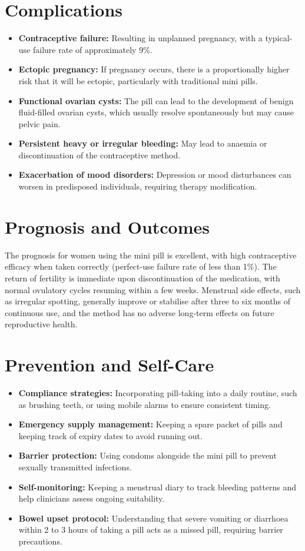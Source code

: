 \section*{Complications}
\begin{itemize}
    \item \textbf{Contraceptive failure:} Resulting in unplanned pregnancy, with a typical-use failure rate of approximately 9\%.
    \item \textbf{Ectopic pregnancy:} If pregnancy occurs, there is a proportionally higher risk that it will be ectopic, particularly with traditional mini pills.
    \item \textbf{Functional ovarian cysts:} The pill can lead to the development of benign fluid-filled ovarian cysts, which usually resolve spontaneously but may cause pelvic pain.
    \item \textbf{Persistent heavy or irregular bleeding:} May lead to anaemia or discontinuation of the contraceptive method.
    \item \textbf{Exacerbation of mood disorders:} Depression or mood disturbances can worsen in predisposed individuals, requiring therapy modification.
\end{itemize}

\section*{Prognosis and Outcomes}
The prognosis for women using the mini pill is excellent, with high contraceptive efficacy when taken correctly (perfect-use failure rate of less than 1\%). The return of fertility is immediate upon discontinuation of the medication, with normal ovulatory cycles resuming within a few weeks. Menstrual side effects, such as irregular spotting, generally improve or stabilise after three to six months of continuous use, and the method has no adverse long-term effects on future reproductive health.

\section*{Prevention and Self-Care}
\begin{itemize}
    \item \textbf{Compliance strategies:} Incorporating pill-taking into a daily routine, such as brushing teeth, or using mobile alarms to ensure consistent timing.
    \item \textbf{Emergency supply management:} Keeping a spare packet of pills and keeping track of expiry dates to avoid running out.
    \item \textbf{Barrier protection:} Using condoms alongside the mini pill to prevent sexually transmitted infections.
    \item \textbf{Self-monitoring:} Keeping a menstrual diary to track bleeding patterns and help clinicians assess ongoing suitability.
    \item \textbf{Bowel upset protocol:} Understanding that severe vomiting or diarrhoea within 2 to 3 hours of taking a pill acts as a missed pill, requiring barrier precautions.
\end{itemize}

